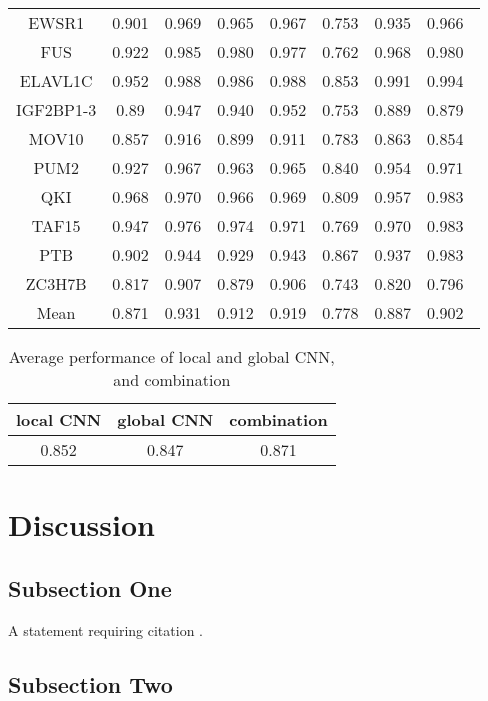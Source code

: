 \documentclass[twoside,twocolumn]{article}
\begin{document}
\begin{table*}
\begin{tabular}{c|ccccccc}
  EWSR1    & 0.901 & 0.969 & 0.965 & 0.967 & 0.753 & 0.935 & 0.966 \\
  FUS      & 0.922 & 0.985 & 0.980 & 0.977 & 0.762 & 0.968 & 0.980 \\
  ELAVL1C  & 0.952 & 0.988 & 0.986 & 0.988 & 0.853 & 0.991 & 0.994 \\
  IGF2BP1-3 & 0.89 & 0.947 & 0.940 & 0.952 & 0.753 & 0.889 & 0.879 \\
  MOV10    & 0.857 & 0.916 & 0.899 & 0.911 & 0.783 & 0.863 & 0.854 \\
  PUM2     & 0.927 & 0.967 & 0.963 & 0.965 & 0.840 & 0.954 & 0.971 \\
  QKI      & 0.968 & 0.970 & 0.966 & 0.969 & 0.809 & 0.957 & 0.983 \\
  TAF15    & 0.947 & 0.976 & 0.974 & 0.971 & 0.769 & 0.970 & 0.983 \\
  PTB      & 0.902 & 0.944 & 0.929 & 0.943 & 0.867 & 0.937 & 0.983 \\
  ZC3H7B   & 0.817 & 0.907 & 0.879 & 0.906 & 0.743 & 0.820 & 0.796 \\
  Mean     & 0.871 & 0.931 & 0.912 & 0.919 & 0.778 & 0.887 & 0.902 \\
  \bottomrule
  \end{tabular}
  \end{table*}
  

\begin{table}
  \caption{Average performance of local and global CNN, and combination}
  \centering
  \begin{tabular}{c|c|c}
    \toprule
    local CNN & global CNN & combination \\
    \midrule
    0.852 & 0.847 & 0.871 \\
    \bottomrule
  \end{tabular}
\end{table}

\section{Discussion}

\subsection{Subsection One}

A statement requiring citation \cite{Figueredo:2009dg}.
\blindtext %

\subsection{Subsection Two}
\end{document}
